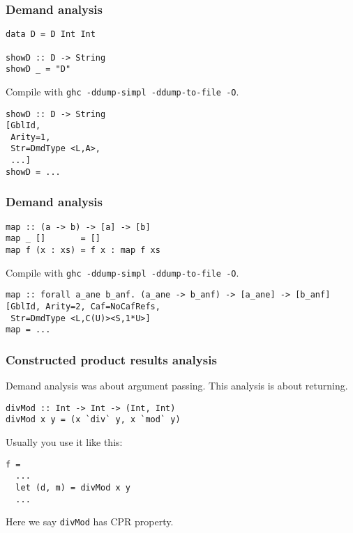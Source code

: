 \documentclass{beamer}
\begin{document}
\begin{frame}[fragile]
    \frametitle{Demand analysis}
    \begin{verbatim}
data D = D Int Int

showD :: D -> String
showD _ = "D"
    \end{verbatim}

    Compile with \texttt{ghc -ddump-simpl -ddump-to-file -O}. \\

    \begin{verbatim}
showD :: D -> String
[GblId,
 Arity=1,
 Str=DmdType <L,A>,
 ...]
showD = ...
    \end{verbatim}
\end{frame}

\begin{frame}[fragile]
    \frametitle{Demand analysis}
    \begin{verbatim}
map :: (a -> b) -> [a] -> [b]
map _ []       = []
map f (x : xs) = f x : map f xs
    \end{verbatim}

    Compile with \texttt{ghc -ddump-simpl -ddump-to-file -O}. \\

    \begin{verbatim}
map :: forall a_ane b_anf. (a_ane -> b_anf) -> [a_ane] -> [b_anf]
[GblId, Arity=2, Caf=NoCafRefs,
 Str=DmdType <L,C(U)><S,1*U>]
map = ...
    \end{verbatim}
\end{frame}

\begin{frame}[fragile]
    \frametitle{Constructed product results analysis}

    Demand analysis was about argument passing. This analysis is about returning. \\

    \begin{verbatim}
divMod :: Int -> Int -> (Int, Int)
divMod x y = (x `div` y, x `mod` y)
    \end{verbatim}

Usually you use it like this: \\

    \begin{verbatim}
f =
  ...
  let (d, m) = divMod x y
  ...
    \end{verbatim}

    Here we say \texttt{divMod} has CPR property.

\end{frame}
\end{document}
